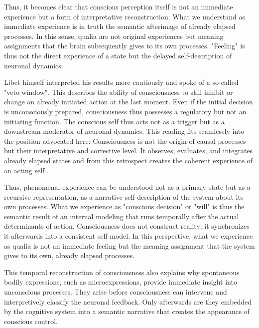 Thus, it becomes clear that conscious perception itself is not an immediate experience but a form of interpretative reconstruction. What we understand as immediate experience is in truth the semantic afterimage of already elapsed processes. In this sense, qualia are not original experiences but meaning assignments that the brain subsequently gives to its own processes. "Feeling" is thus not the direct experience of a state but the delayed self-description of neuronal dynamics.

Libet himself interpreted his results more cautiously and spoke of a so-called "veto window". This describes the ability of consciousness to still inhibit or change an already initiated action at the last moment. Even if the initial decision is unconsciously prepared, consciousness thus possesses a regulatory but not an initiating function. The conscious self thus acts not as a trigger but as a downstream moderator of neuronal dynamics. This reading fits seamlessly into the position advocated here: Consciousness is not the origin of causal processes but their interpretative and corrective level. It observes, evaluates, and integrates already elapsed states and from this retrospect creates the coherent experience of an acting self \cite{Libet1993,Wegner2002,Soon2008}.

Thus, phenomenal experience can be understood not as a primary state but as a recursive representation, as a narrative self-description of the system about its own processes. What we experience as "conscious decision" or "will" is thus the semantic result of an internal modeling that runs temporally after the actual determinants of action. Consciousness does not construct reality; it synchronizes it afterwards into a consistent self-model. In this perspective, what we experience as qualia is not an immediate feeling but the meaning assignment that the system gives to its own, already elapsed processes.

This temporal reconstruction of consciousness also explains why spontaneous bodily expressions, such as microexpressions, provide immediate insight into unconscious processes. They arise before consciousness can intervene and interpretively classify the neuronal feedback. Only afterwards are they embedded by the cognitive system into a semantic narrative that creates the appearance of conscious control.

